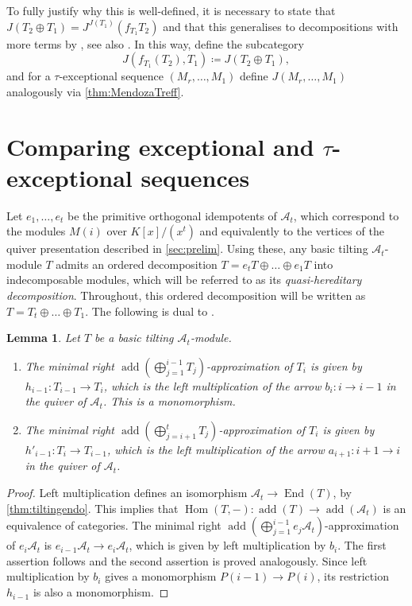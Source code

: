 \documentclass[10pt,twoside, a4paper,reqno]{amsart}
\DeclareMathOperator{\Hom}{Hom}
\DeclareMathOperator{\End}{End}
\DeclareMathOperator{\add}{add}
\newcommand{\A}{\mathscr{A}}
\newtheorem{lemma}[theorem]{Lemma}
\theoremstyle{definition}
\begin{document}
To fully justify why this is well-defined, it is necessary to state that $J(T_2 \oplus T_1) = J^{J(T_1)}(f_{T_1} T_2)$ and that this generalises to decompositions with more terms by \cite[Thm. 1.4]{BuanMarsh2021w}, see also \cite[Thm. 6.4]{BuanHanson2023}. In this way, define the subcategory
\[ J(f_{T_1} (T_2), T_1) \coloneqq J(T_2 \oplus T_1), \]
and for a $\tau$-exceptional sequence $(M_r, \dots, M_1)$ define $J(M_r, \dots, M_1)$ analogously via \cref{thm:MendozaTreff}.


\section{Comparing exceptional and $\tau$-exceptional sequences}\label{sec:mainthm1}

Let $e_1, \dots, e_t$ be the primitive orthogonal idempotents of $\A_t$, which correspond to the modules $M(i)$ over $K[x]/(x^t)$ and equivalently to the vertices of the quiver presentation described in \cref{sec:prelim}. Using these, any basic tilting $\A_t$-module $T$ admits an ordered decomposition $T = e_tT \oplus \dots \oplus e_1 T$ into indecomposable modules, which will be referred to as its \textit{quasi-hereditary decomposition}. Throughout, this ordered decomposition will be written as $T= T_t \oplus \dots \oplus T_1$. The following is dual to \cite[Lem. 4.3]{IyamaZhang2020}.

\begin{lemma}\label{lem:tiltapprox}
    Let $T$ be a basic tilting $\A_t$-module. 
    \begin{enumerate} 
    \item The minimal right $\add( \bigoplus_{j=1}^{i-1} T_j)$-approximation of $T_i$ is given by $h_{i-1}: T_{i-1} \to T_i$, which is the left multiplication of the arrow $b_{i}: i \to i-1$ in the quiver of $\A_t$. This is a monomorphism. 
    \item The minimal right $\add( \bigoplus_{j=i+1}^{t} T_j)$-approximation of $T_i$ is given by $h'_{i-1}: T_{i} \to T_{i-1}$, which is the left multiplication of the arrow $a_{i+1}: i+1 \to i$ in the quiver of $\A_t$. 
    \end{enumerate}
\end{lemma}
\begin{proof}
    Left multiplication defines an isomorphism $\A_t \to \End(T)$, by \cref{thm:tiltingendo}. This implies that $\Hom(T,-): \add (T) \to \add (\A_t)$ is an equivalence of categories. The minimal right $\add(\bigoplus_{j=1}^{i-1} e_j \A_t)$-approximation of $e_i \A_t$ is $e_{i-1}\A_t \to e_i \A_t$, which is given by left multiplication by $b_i$. The first assertion follows and the second assertion is proved analogously. Since left multiplication by $b_i$ gives a monomorphism $P(i-1) \to P(i)$, its restriction $h_{i-1}$ is also a monomorphism. 
\end{proof}
\end{document}
